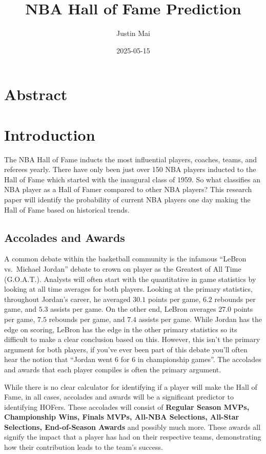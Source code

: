 \documentclass[
  11pt,
]{article}
\title{NBA Hall of Fame Prediction}
\author{Justin Mai}
\date{2025-05-15}
\begin{document}
\maketitle

{
\setcounter{tocdepth}{2}
\tableofcontents
}
\newpage

\section{Abstract}\label{abstract}

\newpage

\section{Introduction}\label{introduction}

The NBA Hall of Fame inducts the most influential players, coaches,
teams, and referees yearly. There have only been just over 150 NBA
players inducted to the Hall of Fame which started with the inaugural
class of 1959. So what classifies an NBA player as a Hall of Famer
compared to other NBA players? This research paper will identify the
probability of current NBA players one day making the Hall of Fame based
on historical trends.

\subsection{Accolades and Awards}\label{accolades-and-awards}

A common debate within the basketball community is the infamous ``LeBron
vs.~Michael Jordan'' debate to crown on player as the Greatest of All
Time (G.O.A.T.). Analysts will often start with the quantitative in game
statistics by looking at all time averages for both players. Looking at
the primary statistics, throughout Jordan's career, he averaged \(30.1\)
points per game, \(6.2\) rebounds per game, and \(5.3\) assists per
game. On the other end, LeBron averages \(27.0\) points per game,
\(7.5\) rebounds per game, and \(7.4\) assists per game. While Jordan
has the edge on scoring, LeBron has the edge in the other primary
statistics so its difficult to make a clear conclusion based on this.
However, this isn't the primary argument for both players, if you've
ever been part of this debate you'll often hear the notion that ``Jordan
went 6 for 6 in championship games''. The accolades and awards that each
player compiles is often the primary argument.

While there is no clear calculator for identifying if a player will make
the Hall of Fame, in all cases, accolades and awards will be a
significant predictor to identifying HOFers. These accolades will
consist of \textbf{Regular Season MVPs, Championship Wins, Finals MVPs,
All-NBA Selections, All-Star Selections, End-of-Season Awards} and
possibly much more. These awards all signify the impact that a player
has had on their respective teams, demonstrating how their contribution
leads to the team's success.
\end{document}
